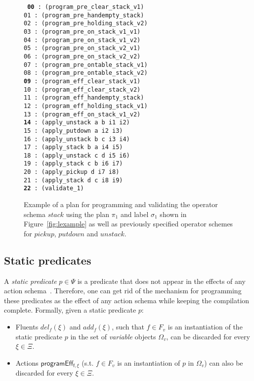 \documentclass[letterpaper]{article} %
\begin{document}
\begin{figure}
{\tt\small
     {\bf 00} : (program\_pre\_clear\_stack\_v1)\\
     01 : (program\_pre\_handempty\_stack)\\
     02 : (program\_pre\_holding\_stack\_v2)\\
     03 : (program\_pre\_on\_stack\_v1\_v1)\\
     04 : (program\_pre\_on\_stack\_v1\_v2)\\
     05 : (program\_pre\_on\_stack\_v2\_v1)\\
     06 : (program\_pre\_on\_stack\_v2\_v2)\\
     07 : (program\_pre\_ontable\_stack\_v1)\\
     08 : (program\_pre\_ontable\_stack\_v2)\\
     {\bf 09} : (program\_eff\_clear\_stack\_v1)\\
    10 : (program\_eff\_clear\_stack\_v2)\\
    11 : (program\_eff\_handempty\_stack)\\
    12 : (program\_eff\_holding\_stack\_v1)\\
    13 : (program\_eff\_on\_stack\_v1\_v2)\\
    {\bf 14} : (apply\_unstack a b i1 i2)\\
    15 : (apply\_putdown a i2 i3)\\
    16 : (apply\_unstack b c i3 i4)\\
    17 : (apply\_stack b a i4 i5)\\
    18 : (apply\_unstack c d i5 i6)\\
    19 : (apply\_stack c b i6 i7)\\
    20 : (apply\_pickup d i7 i8)\\
    21 : (apply\_stack d c i8 i9)\\
    {\bf 22} : (validate\_1)
}
 \caption{\small Example of a plan for programming and validating the operator schema $stack$ using the plan $\pi_1$ and label $\sigma_1$ shown in Figure~\ref{fig:lexample} as well as previously specified operator schemes for $pickup$, $putdown$ and $unstack$.}
\label{fig:plan}
\end{figure}

\subsection{Static predicates}
A {\em static predicate} $p \in \Psi$ is a predicate that does not appear in the effects of any action schema~\cite{fox:TIM:JAIR1998}. Therefore, one can get rid of the mechanism for programming these predicates as the effect of any action schema while keeping the compilation complete. Formally, given a static predicate $p$:
\begin{itemize}
\item Fluents $del_f(\xi)$ and $add_f(\xi)$, such that $f\in F_v$ is an instantiation of the static predicate $p$ in the set of {\em variable} objects $\Omega_v$, can be discarded for every $\xi\in\Xi$.
\item Actions $\mathsf{programEff_{f,\xi}}$ (s.t. $f\in F_v$ is an instantiation of $p$ in $\Omega_v$) can also be discarded for every $\xi\in\Xi$.
\end{itemize}
\end{document}
